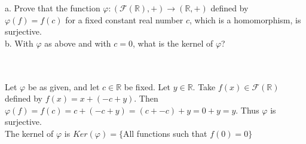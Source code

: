 a. Prove that the function $\varphi:(\mathcal{F}(\mathbb{R}),+)\rightarrow(\mathbb{R},+)$ defined by
$\varphi(f)=f(c)$ for a fixed constant real number $c$, which is a homomorphism, is surjective.\\

b. With $\varphi$ as above and with $c=0$, what is the kernel of $\varphi$?\\\\

\begin{solution}\renewcommand{\qedsymbol}{}\ \\
    Let $\varphi$ be as given, and let $c\in\mathbb{R}$ be fixed. Let $y\in\mathbb{R}$. Take
    $f(x)\in\mathcal{F}(\mathbb{R})$ defined by $f(x)=x+(-c+y)$. Then
    $\varphi(f)=f(c)=c+(-c+y)=(c+-c)+y=0+y=y$. Thus $\varphi$ is surjective.\\

    The kernel of $\varphi$ is $Ker(\varphi)=\{$All functions such that $f(0)=0\}$

\end{solution}